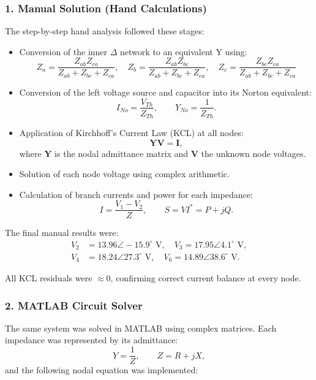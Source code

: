 \documentclass{article}
\begin{document}
\subsubsection*{1. Manual Solution (Hand Calculations)}

The step-by-step hand analysis followed these stages:
\begin{itemize}
    \item Conversion of the inner $\Delta$ network to an equivalent $\text{Y}$ using:
    \[
    Z_a = \frac{Z_{ab}Z_{ca}}{Z_{ab}+Z_{bc}+Z_{ca}}, \quad
    Z_b = \frac{Z_{ab}Z_{bc}}{Z_{ab}+Z_{bc}+Z_{ca}}, \quad
    Z_c = \frac{Z_{bc}Z_{ca}}{Z_{ab}+Z_{bc}+Z_{ca}}
    \]
    \item Conversion of the left voltage source and capacitor into its Norton equivalent:
    \[
    I_{No} = \frac{V_{Th}}{Z_{Th}}, \qquad Y_{No} = \frac{1}{Z_{Th}}.
    \]
    \item Application of Kirchhoff’s Current Law (KCL) at all nodes:
    \[
    \mathbf{Y}\mathbf{V} = \mathbf{I},
    \]
    where $\mathbf{Y}$ is the nodal admittance matrix and $\mathbf{V}$ the unknown node voltages.
    \item Solution of each node voltage using complex arithmetic.
    \item Calculation of branch currents and power for each impedance:
    \[
    I = \frac{V_1 - V_2}{Z}, \qquad
    S = VI^{*} = P + jQ.
    \]
\end{itemize}

The final manual results were:
\[
\begin{aligned}
V_2 &= 13.96\angle -15.9^{\circ}\text{ V}, \quad
V_3 = 17.95\angle 4.1^{\circ}\text{ V},\\[4pt]
V_4 &= 18.24\angle 27.3^{\circ}\text{ V}, \quad
V_6 = 14.89\angle 38.6^{\circ}\text{ V}.
\end{aligned}
\]

\noindent
All KCL residuals were $\approx 0$, confirming correct current balance at every node.

\subsubsection*{2. MATLAB Circuit Solver}

The same system was solved in MATLAB using complex matrices.  
Each impedance was represented by its admittance:
\[
Y = \frac{1}{Z}, \qquad Z = R + jX,
\]
and the following nodal equation was implemented:
\end{document}
